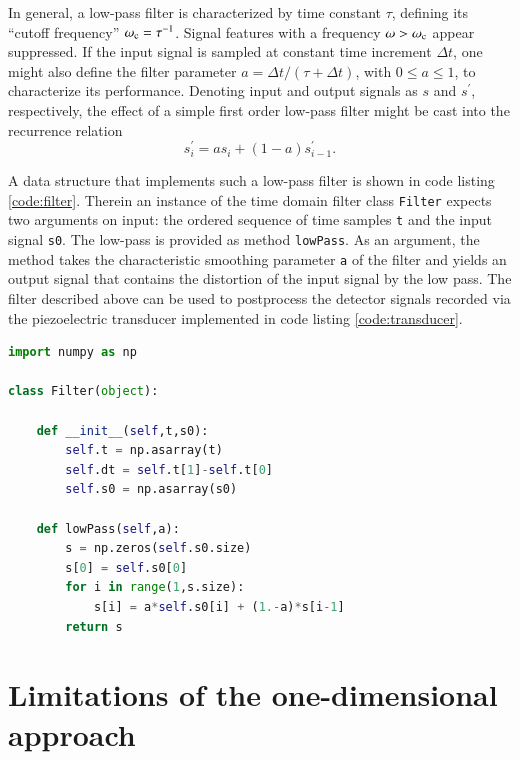 \documentclass[5p,times,twocolumn]{elsarticle}
\begin{document}
In general, a low-pass filter is characterized by time constant $\tau$,
defining its ``cutoff frequency'' $\omega_{\rm c}=\tau^{-1}$. Signal
features with a frequency $\omega > \omega_{\rm c}$ appear suppressed. If the
input signal is sampled at constant time increment $\Delta t$, one might also
define the filter parameter $a = \Delta t/(\tau+\Delta t)$, with $0\leq a \leq
1$, to characterize its performance.  Denoting input and output signals as $s$
and $s^\prime$, respectively, the effect of a simple first order low-pass
filter might be cast into the recurrence relation 
\begin{equation}
s^\prime_i = a s_i + (1-a) s^\prime_{i-1}. \label{eq:lowPass}
\end{equation}

A data structure that implements such a low-pass filter is shown in code
listing \ref{code:filter}. Therein an instance of the time domain filter class
{\tt{Filter}} expects two arguments on input: the ordered sequence of
time samples {\tt{t}} and the input signal {\tt{s0}}.  The low-pass is provided
as method {\tt{lowPass}}. As an argument, the method takes the characteristic
smoothing parameter {\tt{a}} of the filter and yields an output signal that
contains the distortion of the input signal by the low pass.  The filter
described above can be used to postprocess the detector signals recorded via
the piezoelectric transducer implemented in code listing \ref{code:transducer}.

\begin{lstlisting}[float,captionpos=b, keywordstyle=\bf, frame=lines, language=Python,basicstyle=\ttfamily\scriptsize, 
caption={Implementation of a low-pass filter, contained in
{\tt{python}} module file {\tt{timeDomainFilter.py}}.}, label=code:filter]
import numpy as np

class Filter(object):

    def __init__(self,t,s0):
        self.t = np.asarray(t)
        self.dt = self.t[1]-self.t[0]
        self.s0 = np.asarray(s0)

    def lowPass(self,a):
        s = np.zeros(self.s0.size)
        s[0] = self.s0[0]
        for i in range(1,s.size):
            s[i] = a*self.s0[i] + (1.-a)*s[i-1]  
        return s

\end{lstlisting}


\section{Limitations of the one-dimensional approach}
\label{sec:S3}
\end{document}
